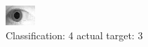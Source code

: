 \begin{figure}[h!]
\begin{center}
\includegraphics[width=0.60\columnwidth]{figures/ID1798_class_4_target_3.png}
\end{center}
\caption{ Classification: 4 actual target: 3}
\label{fig:ID1798_class_4_target_3}
\end{figure}
